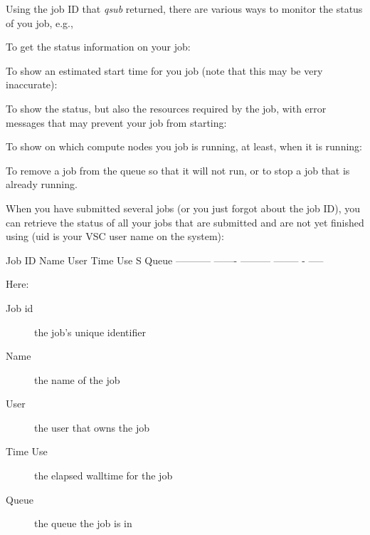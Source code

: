 Using the job ID that \textit{qsub} returned, there are various ways to monitor
the status of you job, e.g.,

To get the status information on your job:

\begin{prompt}
\end{prompt}

To show an estimated start time for you job (note that this may be very inaccurate):

\begin{prompt}
\end{prompt}

To show the status, but also the resources required by the job, with error
messages that may prevent your job from starting:

\begin{prompt}
\end{prompt}

To show on which compute nodes you job is running, at least, when it is
running:

\begin{prompt}
\end{prompt}

To remove a job from the queue so that it will not run, or to stop a job that
is already running.

\begin{prompt}
\end{prompt}

When you have submitted several jobs (or you just forgot about the job ID), you
can retrieve the status of all your jobs that are submitted and are not yet
finished using (uid is your VSC user name on the system):

\begin{prompt}
Job ID      Name    User      Time Use S Queue
----------- ------- --------- -------- - -----
\end{prompt}

Here:
\begin{description}
  \item[Job id] the job's unique identifier
  \item[Name] the name of the job
  \item[User] the user that owns the job
  \item[Time Use] the elapsed walltime for the job
  \item[Queue] the queue the job is in
\end{description}

